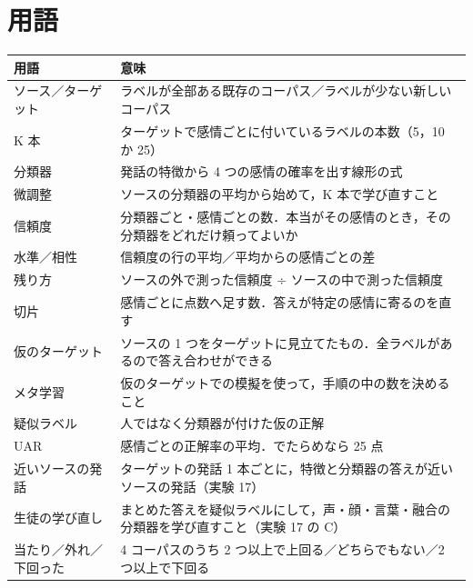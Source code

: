 \documentclass[a4paper,11pt]{ltjsarticle}
\begin{document}
\appendix
\section{用語}
\begin{center}
\small
\begin{tabular}{>{\raggedright}p{3.6cm}p{11.8cm}}
\toprule
用語 & 意味 \\
\midrule
ソース／ターゲット & ラベルが全部ある既存のコーパス／ラベルが少ない新しいコーパス \\
K 本 & ターゲットで感情ごとに付いているラベルの本数（5，10 か 25） \\
分類器 & 発話の特徴から 4 つの感情の確率を出す線形の式 \\
微調整 & ソースの分類器の平均から始めて，K 本で学び直すこと \\
信頼度 & 分類器ごと・感情ごとの数．本当がその感情のとき，その分類器をどれだけ頼ってよいか \\
水準／相性 & 信頼度の行の平均／平均からの感情ごとの差 \\
残り方 & ソースの外で測った信頼度 ÷ ソースの中で測った信頼度 \\
切片 & 感情ごとに点数へ足す数．答えが特定の感情に寄るのを直す \\
仮のターゲット & ソースの 1 つをターゲットに見立てたもの．全ラベルがあるので答え合わせができる \\
メタ学習 & 仮のターゲットでの模擬を使って，手順の中の数を決めること \\
疑似ラベル & 人ではなく分類器が付けた仮の正解 \\
UAR & 感情ごとの正解率の平均．でたらめなら 25 点 \\
近いソースの発話 & ターゲットの発話 1 本ごとに，特徴と分類器の答えが近いソースの発話（実験 17） \\
生徒の学び直し & まとめた答えを疑似ラベルにして，声・顔・言葉・融合の分類器を学び直すこと（実験 17 の C） \\
当たり／外れ／下回った & 4 コーパスのうち 2 つ以上で上回る／どちらでもない／2 つ以上で下回る \\
\bottomrule
\end{tabular}
\end{center}
\end{document}
